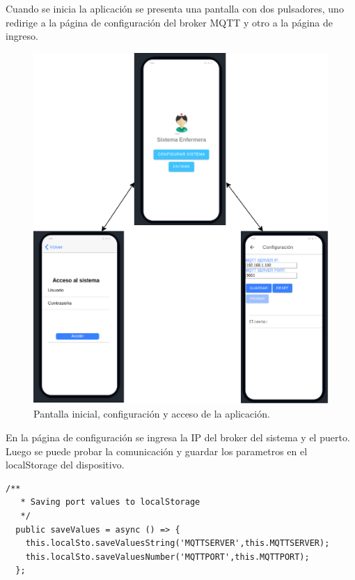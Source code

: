 Cuando se inicia la aplicación se presenta una pantalla con dos pulsadores, uno redirige a la página de configuración del broker MQTT y otro a la página de ingreso.
\begin{figure}[ht]
	\centering
	\includegraphics[scale=.80]{./Figures/app/inicioApp.png}
	\caption{ Pantalla inicial, configuración y acceso de la aplicación.}
	\label{fig: Pantalla inicial, configuración y acceso de la aplicación.}
\end{figure} 

En la página de configuración se ingresa la IP del broker del sistema y el puerto. Luego se puede probar la comunicación y guardar los parametros en el localStorage del dispositivo.

\begin{lstlisting}[label=cod:LocalStorage,caption=  Funciones del servicio que guardan en el localStorage]
  /**
   * Saving port values to localStorage
   */
  public saveValues = async () => {     
    this.localSto.saveValuesString('MQTTSERVER',this.MQTTSERVER);
    this.localSto.saveValuesNumber('MQTTPORT',this.MQTTPORT);
  };
\end{lstlisting}

